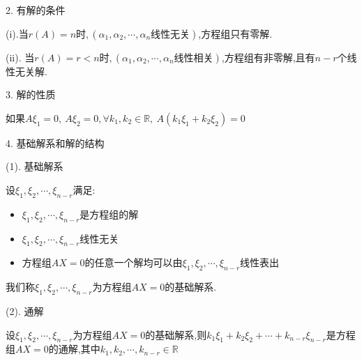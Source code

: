 \begin{definition}[齐次方程组]
	2. 有解的条件
	
	(i).当$r(A)=n\text{时},(\alpha_{1},\alpha_{2},\cdots,\alpha_{n}\text{线性无关})$,方程组只有零解.
	
	(ii). 当$r(A)=r<n\text{时},(\alpha_{1},\alpha_{2},\cdots,\alpha_{n}\text{线性相关})$,方程组有非零解,且有$n-r$个线性无关解.
	
	3. 解的性质
	
	如果$A\xi_{1}=0,\ A\xi_{2}=0, \forall k_{1},k_{2}\in \mathbb{R},\ A(k_{1}\xi_{1}+k_{2}\xi_{2})=0 $
	
	4. 基础解系和解的结构
	
	(1). 基础解系
	
	设$\xi_{1},\xi_{2},\cdots,\xi_{n-r}$满足:  
	\begin{itemize}
		\item $\xi_{1},\xi_{2},\cdots,\xi_{n-r}\text{是方程组的解}$
		\item $\xi_{1},\xi_{2},\cdots,\xi_{n-r}\text{线性无关}$
		\item $\text{方程组}AX=0\text{的任意一个解均可以由}\xi_{1},\xi_{2},\cdots,\xi_{n-r}\text{线性表出}$
	\end{itemize}
	
	我们称$\xi_{1},\xi_{2},\cdots,\xi_{n-r}$为方程组$AX=0$的基础解系.
	
	(2). 通解
	
	设$\xi_{1},\xi_{2},\cdots,\xi_{n-r}$为方程组$AX=0$的基础解系,则$k_{1}\xi_{1}+k_{2}\xi_{2}+\cdots+k_{n-r}\xi_{n-r}$是方程组$AX=0$的通解,其中$k_{1},k_{2},\cdots,k_{n-r}\in \mathbb{R}$
\end{definition}
